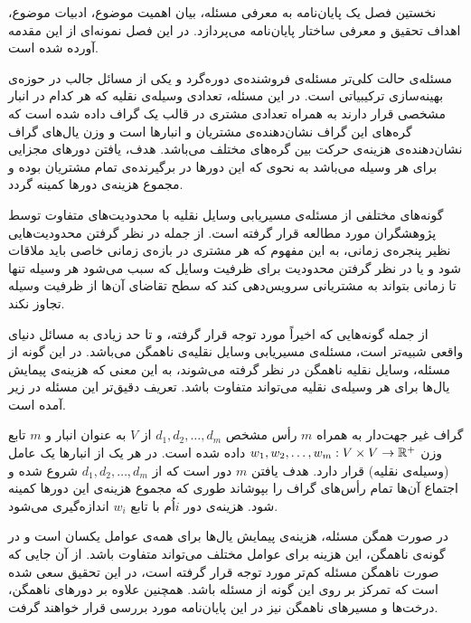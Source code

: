 



نخستین فصل یک پایان‌نامه به معرفی مسئله، بیان اهمیت موضوع، ادبیات موضوع،
اهداف تحقیق و معرفی ساختار پایان‌نامه می‌پردازد.
در این فصل نمونه‌ای از این مقدمه آورده شده است.



مسئله‌ی 
حالت کلی‌تر مسئله‌ی فروشنده‌ی دوره‌گرد و یکی از مسائل جالب در حوزه‌ی بهینه‌سازی ترکیبیاتی 
است. در این مسئله، تعدادی وسیله‌ی نقلیه که هر کدام در انبار مشخصی قرار دارند به همراه تعدادی مشتری در قالب یک گراف  داده شده است که گره‌های این گراف نشان‌دهنده‌ی مشتریان و انبارها است و وزن یال‌های گراف نشان‌دهنده‌ی هزینه‌ی حرکت بین گره‌های مختلف می‌باشد. هدف، یافتن دورهای مجزایی برای هر وسیله می‌باشد به نحوی که این دورها در برگیرنده‌ی تمام مشتریان بوده و مجموع هزینه‌ی دورها کمینه گردد.


گونه‌های مختلفی از مسئله‌ی مسیریابی وسایل نقلیه با محدودیت‌های متفاوت توسط پژوهشگران مورد مطالعه قرار گرفته است. از جمله در نظر گرفتن محدودیت‌هایی نظیر پنجره‌ی زمانی، به این مفهوم که هر مشتری در بازه‌ی زمانی خاصی باید ملاقات شود و یا در نظر گرفتن محدودیت برای ظرفیت وسایل که سبب می‌شود هر وسیله تنها تا زمانی بتواند به مشتریانی سرویس‌دهی کند که سطح تقاضای آن‌ها از ظرفیت وسیله تجاوز نکند. 

از جمله گونه‌هایی که اخیراً مورد توجه قرار گرفته، و تا حد زیادی به مسائل دنیای واقعی شبیه‌تر است، مسئله‌ی مسیریابی وسایل نقلیه‌ی ناهمگن می‌باشد. در این گونه از مسئله، وسایل نقلیه ناهمگن در نظر گرفته می‌شوند، به این معنی که هزینه‌ی پیمایش یال‌ها برای هر وسیله‌ی نقلیه می‌تواند متفاوت ‌باشد. 
تعریف دقیق‌تر این مسئله در زیر آمده است.


 گراف غیر جهت‌دار   به همراه $m$ رأس مشخص $d_1, d_2, \ldots, d_m$ از $V$ به عنوان انبار و $m$ تابع وزن $w_1, w_2, \ldots,  w_m: V \times V \rightarrow \mathbb{R}^+$ داده شده است. در هر یک از انبارها یک عامل (وسیله‌ی نقلیه) قرار دارد. هدف یافتن $m$ دور است که از $d_1, d_2, \ldots,  d_m$ شروع شده و اجتماع آن‌ها تمام رأس‌های گراف را بپوشاند طوری که مجموع هزینه‌ی این دورها کمینه شود.
 هزینه‌ی دور $i$اُم با تابع $w_i$ اندازه‌گیری می‌شود.
 
در صورت همگن مسئله، هزینه‌ی پیمایش یال‌ها برای همه‌ی عوامل یکسان است و در گونه‌ی ناهمگن،
این هزینه برای عوامل مختلف می‌تواند متفاوت باشد. 
از آن‌ جایی که صورت ناهمگن مسئله کم‌تر مورد توجه قرار گرفته است،
در این تحقیق سعی شده است که تمرکز بر روی این گونه از مسئله باشد.
همچنین علاوه بر دورهای ناهمگن، درخت‌ها و مسیرهای ناهمگن نیز در این پایان‌نامه مورد بررسی قرار خواهند گرفت.

